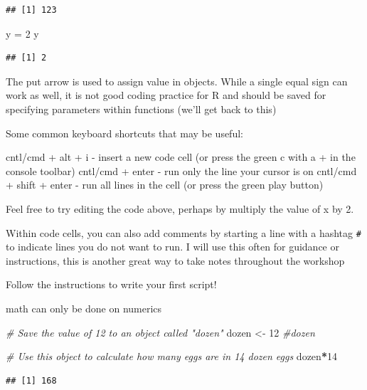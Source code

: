 \documentclass[
]{book}
\newenvironment{Shaded}{\begin{snugshade}}{\end{snugshade}}
\newcommand{\CommentTok}[1]{\textcolor[rgb]{0.56,0.35,0.01}{\textit{#1}}}
\newcommand{\DecValTok}[1]{\textcolor[rgb]{0.00,0.00,0.81}{#1}}
\newcommand{\NormalTok}[1]{#1}
\newcommand{\OtherTok}[1]{\textcolor[rgb]{0.56,0.35,0.01}{#1}}
\newcommand{\SpecialCharTok}[1]{\textcolor[rgb]{0.81,0.36,0.00}{\textbf{#1}}}
\begin{document}
\begin{verbatim}
## [1] 123
\end{verbatim}

\begin{Shaded}
\begin{Highlighting}[]
\NormalTok{y }\OtherTok{=} \DecValTok{2}
\NormalTok{y}
\end{Highlighting}
\end{Shaded}

\begin{verbatim}
## [1] 2
\end{verbatim}

The put arrow is used to assign value in objects. While a single equal sign can work as well, it is not good coding practice for R and should be saved for specifying parameters within functions (we'll get back to this)

Some common keyboard shortcuts that may be useful:

cntl/cmd + alt + i - insert a new code cell (or press the green c with a + in the console toolbar)
cntl/cmd + enter - run only the line your cursor is on
cntl/cmd + shift + enter - run all lines in the cell (or press the green play button)

Feel free to try editing the code above, perhaps by multiply the value of x by 2.

Within code cells, you can also add comments by starting a line with a hashtag \texttt{\#} to indicate lines you do not want to run. I will use this often for guidance or instructions, this is another great way to take notes throughout the workshop

Follow the instructions to write your first script!

math can only be done on numerics

\begin{Shaded}
\begin{Highlighting}[]
\CommentTok{\# Save the value of 12 to an object called "dozen" }
\NormalTok{dozen }\OtherTok{\textless{}{-}} \DecValTok{12}
\CommentTok{\#dozen}

\CommentTok{\# Use this object to calculate how many eggs are in 14 dozen eggs}
\NormalTok{dozen}\SpecialCharTok{*}\DecValTok{14}
\end{Highlighting}
\end{Shaded}

\begin{verbatim}
## [1] 168
\end{verbatim}
\end{document}
